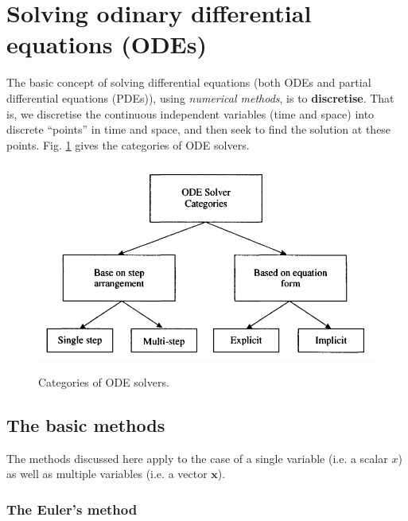 \documentclass[a4paper,11pt]{article}
\newcommand{\bm}{\mathbf}
\theoremstyle{definition}
\begin{document}
\section{Solving odinary differential equations (ODEs)}

The basic concept of solving differential equations (both ODEs and partial differential equations (PDEs)),
using \emph{numerical methods}, is to \textbf{discretise}. That is, we discretise the continuous independent
variables (time and space) into discrete ``points'' in time and space, and then seek to find the
solution at these points. Fig. \ref{fig:solver_clas} gives the categories of ODE solvers.

\begin{figure} [!h]
 \begin{center}
	\includegraphics[width=.6\textwidth]{solver_class}\\
 \end{center}
 \caption{Categories of ODE solvers.} 
 \label{fig:solver_clas}
\end{figure}

\subsection{The basic methods}

The methods discussed here apply to the case of a single variable (i.e. a scalar $x$)
as well as multiple variables (i.e. a vector $\bm x$).

\subsubsection*{The Euler's method}
\end{document}
